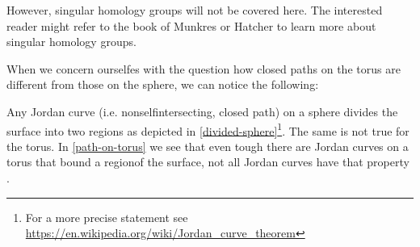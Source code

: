 \documentclass[draft]{scrartcl}
\theoremstyle{plain}
\theoremstyle{definition}
\theoremstyle{remark}
\begin{document}
However, singular homology groups will not be covered here. The interested reader might refer to the book of Munkres \cite{mu} or Hatcher \cite{ha} to learn more about singular homology groups.

When we concern ourselfes with the question how closed paths on the torus are different from those on the sphere, we can notice the following:

Any Jordan curve (i.e. nonselfintersecting, closed path) on a sphere divides the surface into two \glqq regions\grqq{} as depicted in \autoref{divided-sphere}\footnote{For a more precise statement see \url{https://en.wikipedia.org/wiki/Jordan_curve_theorem}}. The same is not true for the torus. In \autoref{path-on-torus} we see that even tough there are Jordan curves on a torus that bound a \glqq region\grqq of the surface, not all Jordan curves have that property \cite[p. 173f][see]{ar}.


\end{document}
